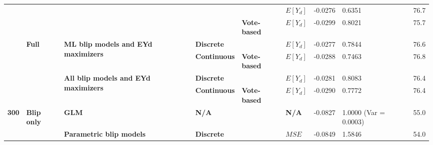 \documentclass[a4paper,12pt]{article}
\begin{document}
\begin{table}[]
{\begin{tabular}{|l|l|l|l|l|l|l|l|l|}
                                &                                      &                                                              &                                      &                                      & \textbf{$E[Y_d]$} & -0.0276              & 0.6351                        & 76.7              \\ \cline{5-9} 
                                &                                      &                                                              &                                      & \textbf{Vote-based}                  & \textbf{$E[Y_d]$} & -0.0299              & 0.8021                        & 75.7              \\ \cline{2-9} 
                                & \multirow{4}{*}{\textbf{Full}}       & \multirow{2}{*}{\textbf{ML blip models and EYd maximizers}}  & \multicolumn{2}{l|}{\textbf{Discrete}}                                      & \textbf{$E[Y_d]$} & -0.0277              & 0.7844                        & 76.6              \\ \cline{4-9} 
                                &                                      &                                                              & \textbf{Continuous}                  & \textbf{Vote-based}                  & \textbf{$E[Y_d]$} & -0.0288              & 0.7463                        & 76.8              \\ \cline{3-9} 
                                &                                      & \multirow{2}{*}{\textbf{All blip models and EYd maximizers}} & \multicolumn{2}{l|}{\textbf{Discrete}}                                      & \textbf{$E[Y_d]$} & -0.0281              & 0.8083                        & 76.4              \\ \cline{4-9} 
                                &                                      &                                                              & \textbf{Continuous}                  & \textbf{Vote-based}                  & \textbf{$E[Y_d]$} & -0.0290              & 0.7772                        & 76.4              \\ \hline
\multirow{20}{*}{\textbf{300}}  & \multirow{16}{*}{\textbf{Blip only}} & \textbf{GLM}                                                 & \multicolumn{2}{l|}{\textbf{N/A}}                                           & \textbf{N/A}     & -0.0827              & 1.0000 (Var = 0.0003)                       & 55.0              \\ \cline{3-9} 
                                &                                      & \multirow{5}{*}{\textbf{Parametric blip models}}             & \multicolumn{2}{l|}{\multirow{2}{*}{\textbf{Discrete}}}                     & \textbf{$MSE$}  & -0.0849              & 1.5846                        & 54.0              \\ \cline{6-9} 

\end{tabular}}
\end{table}
\end{document}
